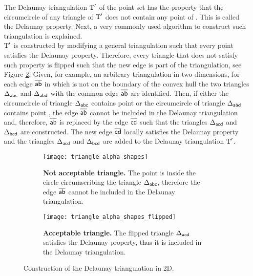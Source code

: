 The Delaunay triangulation $\mbox{$\textup{T}$}^{\prime}$ of the point set  has the property that the circumcircle of any triangle of $\mbox{$\textup{T}$}^{\prime}$ does not contain any point of . This is called the Delaunay property. Next, a very commonly used algorithm to construct such triangulation is explained.\\ \indent 
$\mbox{$\textup{T}$}^\prime$ is constructed by modifying a general triangulation  such that every point satisfies the Delaunay property. 
Therefore, every triangle that does not satisfy such property is flipped such that the new edge is part of the triangulation, see Figure \ref{fig:Delaunay}. 
Given, for example, an arbitrary triangulation  in two-dimensions, for each edge $\overline{\textsf{ab}}$ in  which is not on the boundary of the convex hull the two triangles 
$\Delta_{\textsf{abc}}$ and $\Delta_{\textsf{abd}}$ with the common edge $\overline{\textsf{ab}}$ are identified. Then, if either the circumcircle of triangle $\Delta_{\textsf{abc}}$ contains point  or the circumcircle of triangle $\Delta_{\textsf{abd}}$ contains point , the edge $\overline{\textsf{ab}}$ cannot be included in the Delaunay triangulation and, therefore, $\overline{\textsf{ab}}$ is replaced by the edge $\overline{\textsf{cd}}$ such that the triangles $\Delta_{\textsf{acd}}$ and $\Delta_{\textsf{bcd}}$ are constructed. The new edge $\overline{\textsf{cd}}$ locally satisfies the Delaunay property and the triangles $\Delta_{\textsf{acd}}$ and  $\Delta_{\textsf{bcd}}$ are added to the Delaunay triangulation $\mbox{$\textup{T}$}^\prime$.  
\begin{figure}[t]\label{fig:Delaunay}
\begin{subfigure}[t]{0.48\textwidth}
\centering
\texttt{[image: triangle\_alpha\_shapes]}
\label{fig:shape}
\caption{\textbf{Not acceptable triangle.} The point  is inside the circle circumscribing the triangle $\Delta_{\textsf{abc}}$, therefore the edge $\overline{\textsf{ab}}$ cannot be included in the Delaunay triangulation.}
\end{subfigure}
\hfill
\begin{subfigure}[t]{0.48\textwidth}
\centering
\texttt{[image: triangle\_alpha\_shapes\_flipped]}
\caption{\textbf{Acceptable triangle.} The flipped triangle $\Delta_{\textsf{acd}}$ satisfies the Delaunay property, thus it is included in the Delaunay triangulation.}
\end{subfigure}
\caption{Construction of the Delaunay triangulation in 2D.}
\label{fig:Delaunay}
\end{figure}
